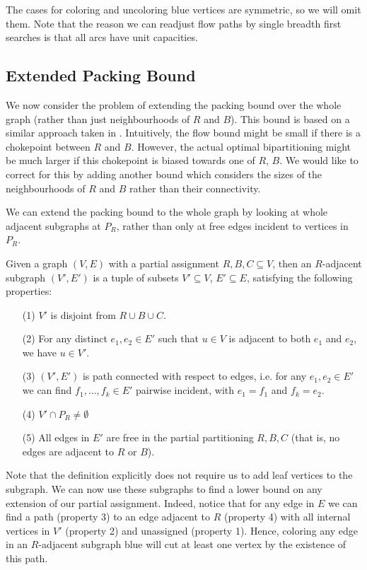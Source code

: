 	The cases for coloring and uncoloring blue vertices are symmetric, so we
	will omit them.
	Note that the reason we can readjust flow paths by single breadth first
	searches is that all arcs have unit capacities.

	\subsection{Extended Packing Bound}

	We now consider the problem of extending the packing bound over the whole
	graph (rather than just neighbourhoods of $R$ and $B$). This bound is based
	on a similar approach taken in \cite{delling14}. Intuitively, the flow
	bound might be small if there is a chokepoint between $R$ and $B$. However,
	the actual optimal bipartitioning might be much larger if this
	chokepoint is biased towards one of $R$, $B$. We would like to correct for
	this by adding another bound which considers the
	sizes of the neighbourhoods of $R$ and $B$ rather than their
	connectivity.

	We can extend the packing bound to the whole graph by looking at whole
	adjacent subgraphs at $P_R$, rather than only at free edges incident to
	vertices in $P_R$.

	\begin{definition}
		Given a graph $(V, E)$ with a partial assignment $R, B, C \subseteq V$,
		then an $R$-adjacent subgraph $(V', E')$ is a tuple of subsets
		$V' \subseteq V$, $E' \subseteq E$, satisfying the following
		properties:
		\begin{itemize}
			\item[(1)] $V'$ is disjoint from $R \cup B \cup C$.
			\item[(2)] For any distinct $e_1, e_2 \in E'$ such that $u \in V$
				is adjacent to both $e_1$ and $e_2$, we have $u \in V'$.
			\item[(3)] $(V', E')$ is path connected with respect to edges, i.e.
				for any $e_1, e_2 \in E'$ we can find $f_1, \dots, f_k \in E'$
				pairwise incident, with $e_1 = f_1$ and $f_k = e_2$.
			\item[(4)] $V' \cap P_R \neq \emptyset$
			\item[(5)] All edges in $E'$ are free in the partial partitioning
				$R, B, C$ (that is, no edges are adjacent to $R$ or $B$).
		\end{itemize}
	\end{definition}

	Note that the definition explicitly does not require us to add leaf
	vertices to the subgraph. We can now use these subgraphs to find a lower
	bound on any extension of our partial assignment. Indeed, notice that for
	any edge in $E$ we can find a path (property 3) to an edge adjacent to
	$R$ (property 4) with all internal vertices in $V'$ (property 2) and
	unassigned (property 1). Hence, coloring any edge in an $R$-adjacent
	subgraph blue will cut at least one vertex by the existence of this path.

